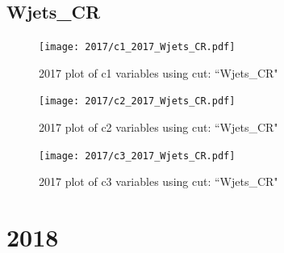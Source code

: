 \documentclass{article}
\begin{document}
      \subsection*{Wjets\_CR}
                        \begin{figure}[H]
                            \centering
                            \caption{2017 plot of c1 variables using cut: ``Wjets\_CR"}
                            \texttt{[image: 2017/c1\_2017\_Wjets\_CR.pdf]}
                        \end{figure}    
                        \begin{figure}[H]
                            \centering
                            \caption{2017 plot of c2 variables using cut: ``Wjets\_CR"}
                            \texttt{[image: 2017/c2\_2017\_Wjets\_CR.pdf]}
                        \end{figure}    
                        \begin{figure}[H]
                            \centering
                            \caption{2017 plot of c3 variables using cut: ``Wjets\_CR"}
                            \texttt{[image: 2017/c3\_2017\_Wjets\_CR.pdf]}
                        \end{figure}    
    \section*{2018}
\end{document}
